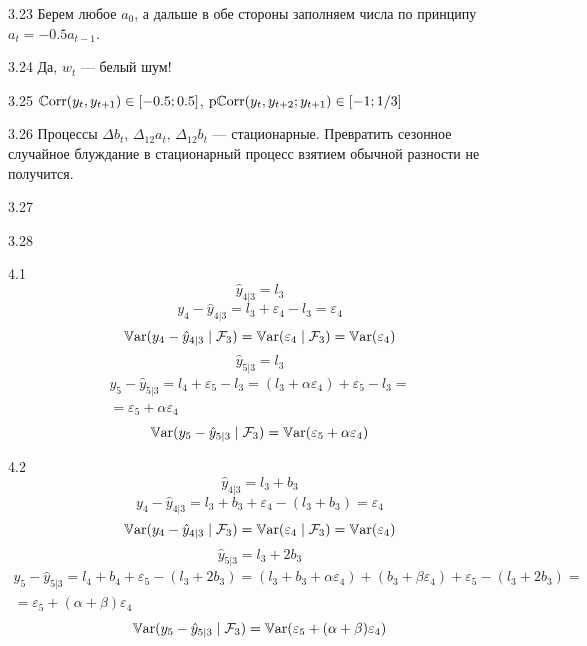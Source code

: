 \protect \hypertarget {soln:3.23}{}
\begin{solution}{{3.23}}
    Берем любое $a_0$, а дальше в обе стороны заполняем числа по принципу $a_t = -0.5 a_{t-1}$.
  
\end{solution}
\protect \hypertarget {soln:3.24}{}
\begin{solution}{{3.24}}
    Да, $w_t$ — белый шум!
  
\end{solution}
\protect \hypertarget {soln:3.25}{}
\begin{solution}{{3.25}}
    $\operatorname{\mathbb{C}\mathrm{orr}}(y_t, y_{t+1}) \in [-0.5; 0.5]$, $\operatorname{\mathrm{p}\mathbb{C}\mathrm{orr}}(y_t, y_{t+2} ; y_{t+1}) \in [-1; 1/3]$
  
\end{solution}
\protect \hypertarget {soln:3.26}{}
\begin{solution}{{3.26}}
    Процессы $\Delta b_t$, $\Delta_{12} a_t$, $\Delta_{12} b_t$ — стационарные.
    Превратить сезонное случайное блуждание в стационарный процесс взятием обычной разности не получится.
  
\end{solution}
\protect \hypertarget {soln:3.27}{}
\begin{solution}{{3.27}}
  
\end{solution}
\protect \hypertarget {soln:3.28}{}
\begin{solution}{{3.28}}
  
\end{solution}
\protect \hypertarget {soln:4.1}{}
\begin{solution}{{4.1}}
  \[
    \hat y_{4|3} = l_3
  \]
  \[
    y_4 - \hat y_{4|3} = l_3 + \varepsilon_4 - l_3 = \varepsilon_4
  \]
  \[
  \operatorname{\mathbb{V}\mathrm{ar}}(y_4 - \hat y_{4|3} \mid \mathcal{F}_3) = \operatorname{\mathbb{V}\mathrm{ar}}(\varepsilon_4 \mid \mathcal{F}_3) = \operatorname{\mathbb{V}\mathrm{ar}}(\varepsilon_4)
  \]
  \[
  \hat y_{5|3} = l_3
  \]
  \begin{multline}
  y_5 - \hat y_{5|3} = l_4  + \varepsilon_5 - l_3  = (l_3 + \alpha \varepsilon_4)  +
   \varepsilon_5 - l_3 = \\
  = \varepsilon_5 + \alpha  \varepsilon_4
  \end{multline}
  \[
  \operatorname{\mathbb{V}\mathrm{ar}}(y_5 - \hat y_{5|3} \mid \mathcal{F}_3) = \operatorname{\mathbb{V}\mathrm{ar}}(\varepsilon_5 + \alpha  \varepsilon_4 )
  \]

\end{solution}
\protect \hypertarget {soln:4.2}{}
\begin{solution}{{4.2}}
\[
\hat y_{4|3} = l_3 + b_3
\]
\[
y_4 - \hat y_{4|3} = l_3 + b_3 + \varepsilon_4 - (l_3 + b_3) = \varepsilon_4
\]
\[
\operatorname{\mathbb{V}\mathrm{ar}}(y_4 - \hat y_{4|3} \mid \mathcal{F}_3) = \operatorname{\mathbb{V}\mathrm{ar}}(\varepsilon_4 \mid \mathcal{F}_3) = \operatorname{\mathbb{V}\mathrm{ar}}(\varepsilon_4)
\]
\[
\hat y_{5|3} = l_3 + 2b_3
\]
\begin{multline}
y_5 - \hat y_{5|3} = l_4 + b_4 + \varepsilon_5 - (l_3 + 2b_3) = (l_3 + b_3 + \alpha \varepsilon_4)  +
(b_3 + \beta \varepsilon_4) + \varepsilon_5 - (l_3 + 2b_3) = \\
= \varepsilon_5 + (\alpha + \beta) \varepsilon_4
\end{multline}
\[
\operatorname{\mathbb{V}\mathrm{ar}}(y_5 - \hat y_{5|3} \mid \mathcal{F}_3) = \operatorname{\mathbb{V}\mathrm{ar}}(\varepsilon_5 + (\alpha + \beta) \varepsilon_4 )
\]
\end{solution}
